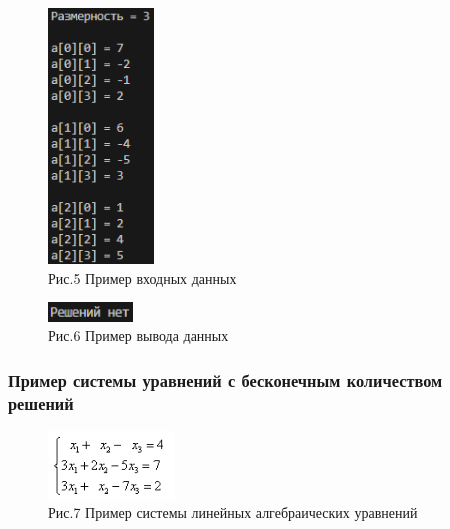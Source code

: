 \documentclass[12pt,a4paper]{scrartcl}
\begin{document}
\begin{figure}
  \begin{center}
    \includegraphics[width=0.25\textwidth]{vhoddan2.png}
  \end{center}
  \caption{Рис.5  Пример входных данных}\label{fig:ex}
\end{figure}

\begin{figure}
  \begin{center}
    \includegraphics[width=0.2\textwidth]{neimeetresh.png}
  \end{center}
  \caption{Рис.6  Пример вывода данных}\label{fig:ex}
\end{figure}

\newpage
\subsubsection{Пример системы уравнений с бесконечным количеством решений}

\begin{figure}
  \begin{center}
    \includegraphics[width=0.3\textwidth]{infinity.png}
  \end{center}
  \caption{Рис.7  Пример системы линейных алгебраических уравнений}\label{fig:ex}
\end{figure}
\end{document}
